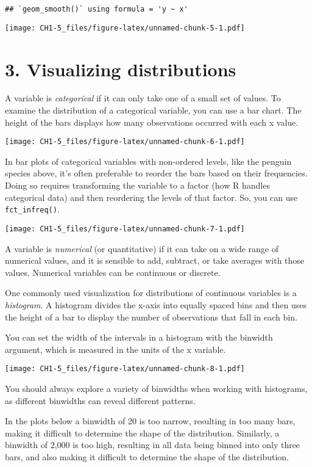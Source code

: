 \documentclass[
]{article}
\begin{document}
\begin{verbatim}
## `geom_smooth()` using formula = 'y ~ x'
\end{verbatim}

\texttt{[image: CH1-5\_files/figure-latex/unnamed-chunk-5-1.pdf]}

\hypertarget{visualizing-distributions}{%
\section{3. Visualizing distributions}\label{visualizing-distributions}}

A variable is \emph{categorical} if it can only take one of a small set
of values. To examine the distribution of a categorical variable, you
can use a bar chart. The height of the bars displays how many
observations occurred with each x value.

\texttt{[image: CH1-5\_files/figure-latex/unnamed-chunk-6-1.pdf]}

In bar plots of categorical variables with non-ordered levels, like the
penguin species above, it's often preferable to reorder the bars based
on their frequencies. Doing so requires transforming the variable to a
factor (how R handles categorical data) and then reordering the levels
of that factor. So, you can use \texttt{fct\_infreq()}.

\texttt{[image: CH1-5\_files/figure-latex/unnamed-chunk-7-1.pdf]}

A variable is \emph{numerical} (or quantitative) if it can take on a
wide range of numerical values, and it is sensible to add, subtract, or
take averages with those values. Numerical variables can be continuous
or discrete.

One commonly used visualization for distributions of continuous
variables is a \emph{histogram}. A histogram divides the x-axis into
equally spaced bins and then uses the height of a bar to display the
number of observations that fall in each bin.

You can set the width of the intervals in a histogram with the binwidth
argument, which is measured in the units of the x variable.

\texttt{[image: CH1-5\_files/figure-latex/unnamed-chunk-8-1.pdf]}

You should always explore a variety of binwidths when working with
histograms, as different binwidths can reveal different patterns.

In the plots below a binwidth of 20 is too narrow, resulting in too many
bars, making it difficult to determine the shape of the distribution.
Similarly, a binwidth of 2,000 is too high, resulting in all data being
binned into only three bars, and also making it difficult to determine
the shape of the distribution.
\end{document}

